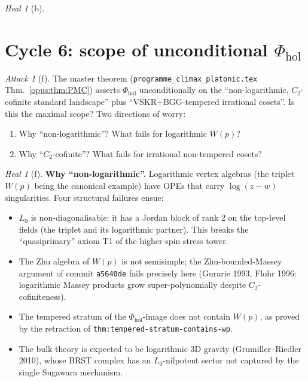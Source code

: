 \documentclass{article}
\theoremstyle{definition}
\theoremstyle{remark}
\newtheorem{attack}[theorem]{Attack}
\newtheorem{heal}[theorem]{Heal}
\newcommand{\Phihol}{\Phi_{\mathrm{hol}}}
\begin{document}
\begin{heal}[b]
\section{Cycle 6: scope of unconditional $\Phihol$}
\label{sec:opus-cycle-6}

\begin{attack}[f]
\label{att:cycle6}
The master theorem
(\texttt{programme\_climax\_platonic.tex}
Thm.~\ref*{opus:thm:PMC}) asserts $\Phihol$ unconditionally
on the ``non-logarithmic, $C_2$-cofinite standard
landscape'' plus ``VSKR+BGG-tempered irrational cosets''.
Is this the maximal scope? Two directions of worry:
\begin{enumerate}[label=\textup{(\roman*)}]
\item Why ``non-logarithmic''? What fails for
logarithmic $W(p)$?
\item Why ``$C_2$-cofinite''? What fails for irrational
non-tempered cosets?
\end{enumerate}
\end{attack}

\begin{heal}[f]
\label{heal:cycle6}
\textbf{Why ``non-logarithmic''.} Logarithmic vertex
algebras (the triplet $W(p)$ being the canonical example)
have OPEs that carry $\log(z-w)$ singularities. Four
structural failures ensue:
\begin{itemize}
\item $L_0$ is non-diagonalisable: it has a Jordan block of
rank 2 on the top-level fields (the triplet and its
logarithmic partner). This breaks the
``quasiprimary'' axiom T1 of the higher-spin stress tower.
\item The Zhu algebra of $W(p)$ is not semisimple; the
Zhu-bounded-Massey argument of commit \texttt{a5640de}
fails precisely here (Gurarie 1993, Flohr 1996:
logarithmic Massey products grow super-polynomially despite
$C_2$-cofiniteness).
\item The tempered stratum of the $\Phihol$-image does not
contain $W(p)$, as proved by the retraction of
\texttt{thm:tempered-stratum-contains-wp}.
\item The bulk theory is expected to be logarithmic 3D
gravity (Grumiller--Riedler 2010), whose BRST complex has
an $L_0$-nilpotent sector not captured by the single
Sugawara mechanism.
\end{itemize}


\end{heal}
\end{heal}
\end{document}
